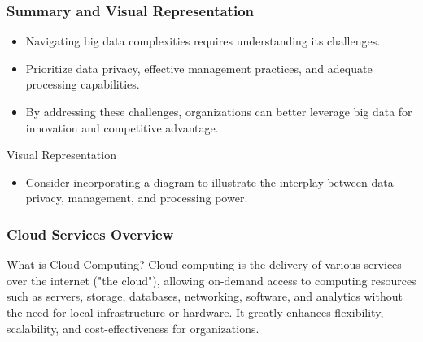 \documentclass[aspectratio=169]{beamer}
\begin{document}
\begin{frame}[fragile]
  \frametitle{Summary and Visual Representation}
  \begin{itemize}
    \item Navigating big data complexities requires understanding its challenges.
    \item Prioritize data privacy, effective management practices, and adequate processing capabilities.
    \item By addressing these challenges, organizations can better leverage big data for innovation and competitive advantage.
  \end{itemize}
  \begin{block}{Visual Representation}
    \begin{itemize}
      \item Consider incorporating a diagram to illustrate the interplay between data privacy, management, and processing power.
    \end{itemize}
  \end{block}
\end{frame}

\begin{frame}[fragile]
  \frametitle{Cloud Services Overview}
  \begin{block}{What is Cloud Computing?}
    Cloud computing is the delivery of various services over the internet ("the cloud"), allowing on-demand access to computing resources such as servers, storage, databases, networking, software, and analytics without the need for local infrastructure or hardware. It greatly enhances flexibility, scalability, and cost-effectiveness for organizations.
  \end{block}
\end{frame}
\end{document}
